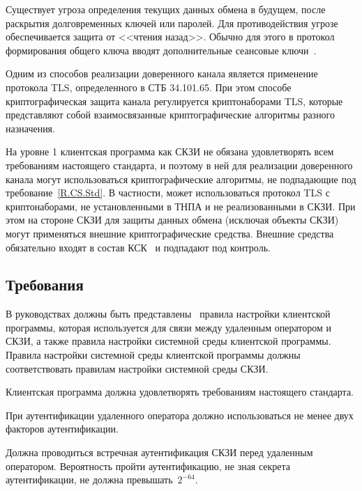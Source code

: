 Существует угроза определения текущих данных обмена в будущем, после раскрытия 
долговременных ключей или паролей. Для противодействия угрозе обеспечивается 
защита от <<чтения назад>>. Обычно для этого в протокол формирования общего ключа
вводят дополнительные сеансовые ключи~. 

Одним из способов реализации доверенного канала является применение протокола
TLS, определенного в СТБ 34.101.65. При этом способе криптографическая защита
канала регулируется криптонаборами TLS, которые представляют собой
взаимосвязанные криптографические алгоритмы разного назначения.

На уровне 1 клиентская программа как СКЗИ не обязана удовлетворять всем 
требованиям настоящего стандарта, и поэтому в ней для реализации доверенного 
канала могут использоваться криптографические алгоритмы, не подпадающие под 
требование~\ref{R.CS.Std}. В частности, может использоваться 
протокол TLS с криптонаборами, не установленными в ТНПА и не 
реализованными в СКЗИ.  
%
При этом на стороне СКЗИ для защиты данных обмена (исключая объекты СКЗИ) 
могут применяться внешние криптографические средства. 
%
Внешние средства обязательно входят в состав КСК~ 
и подпадают под контроль.
\fi

\subsection{Требования}\label{TC.Reqs}

\label{R.TC.GD} %
В руководствах должны быть представлены~ 
правила настройки клиентской программы, которая используется для  
связи между удаленным оператором и СКЗИ, а также правила настройки  
системной среды клиентской программы. 
%
Правила настройки системной среды клиентской программы должны 
соответствовать правилам настройки системной среды СКЗИ.

\label{R.TC.Client} %
Клиентская программа должна удовлетворять требованиям настоящего стандарта. 

\label{R.TC.Auth} %
При аутентификации удаленного оператора должно использоваться не менее двух 
факторов аутентификации.

\label{R.TC.Auth2} %
Должна проводиться встречная аутентификация СКЗИ перед удаленным оператором.
Вероятность пройти аутентификацию, не зная секрета аутентификации, 
не должна превышать~$2^{-64}$.

